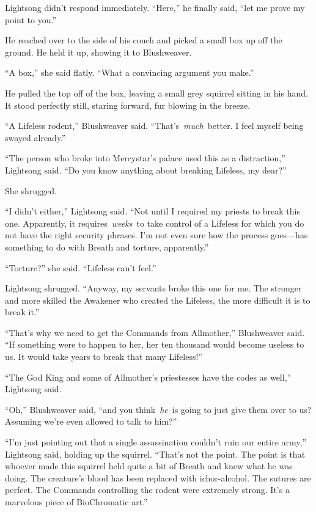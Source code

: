 Lightsong didn’t respond immediately. “Here,” he finally said, “let me prove my point to you.”

He reached over to the side of his couch and picked a small box up off the ground. He held it up, showing it to Blushweaver.

“A box,” she said flatly. “What a convincing argument you make.”

He pulled the top off of the box, leaving a small grey squirrel sitting in his hand. It stood perfectly still, staring forward, fur blowing in the breeze.

“A Lifeless rodent,” Blushweaver said. “That’s~\textit{much}~better. I feel myself being swayed already.”

“The person who broke into Mercystar’s palace used this as a distraction,” Lightsong said. “Do you know anything about breaking Lifeless, my dear?”

She shrugged.

“I didn’t either,” Lightsong said. “Not until I required my priests to break this one. Apparently, it requires~\textit{weeks}~to take control of a Lifeless for which you do not have the right security phrases. I’m not even sure how the process goes—has something to do with Breath and torture, apparently.”

“Torture?” she said. “Lifeless can’t feel.”

Lightsong shrugged. “Anyway, my servants broke this one for me. The stronger and more skilled the Awakener who created the Lifeless, the more difficult it is to break it.”

“That’s why we need to get the Commands from Allmother,” Blushweaver said. “If something were to happen to her, her ten thousand would become useless to us. It would take years to break that many Lifeless!”

“The God King and some of Allmother’s priestesses have the codes as well,” Lightsong said.

“Oh,” Blushweaver said, “and you think~\textit{he}~is going to just give them over to us? Assuming we’re even allowed to talk to him?”

“I’m just pointing out that a single assassination couldn’t ruin our entire army,” Lightsong said, holding up the squirrel. “That’s not the point. The point is that whoever made this squirrel held quite a bit of Breath and knew what he was doing. The creature’s blood has been replaced with ichor-alcohol. The sutures are perfect. The Commands controlling the rodent were extremely strong. It’s a marvelous piece of BioChromatic art.”

